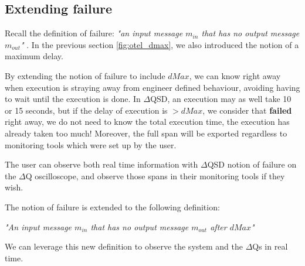\subsection{Extending failure}
   Recall the definition of failure: \textit{"an input message $m_{in}$ that has no output message $m_{out}$"} \cite{art}. In the previous section \ref{fig:otel_dmax}, we also introduced the notion of a maximum delay. 

   By extending the notion of failure to include $dMax$, we can know right away when execution is straying away from engineer defined behaviour, avoiding having to wait until the execution is done. In $\Delta$QSD, an execution may as well take 10 or 15 seconds, but if the delay of execution is $> dMax$, we consider that \textbf{failed} right away, we do not need to know the total execution time, the execution has already taken too much! Moreover, the full span will be exported regardless to monitoring tools which were set up by the user. 

   The user can observe both real time information with $\Delta$QSD notion of failure on the $\Delta$Q oscilloscope, and observe those spans in their monitoring tools if they wish.

The notion of failure is extended to the following definition:
        \begin{center}
            \textit{"An input message $m_{in}$ that has no output message $m_{out}$ after $dMax$"} 
        \end{center}
    We can leverage this new definition to observe the system and the $\Delta$Qs in real time.

